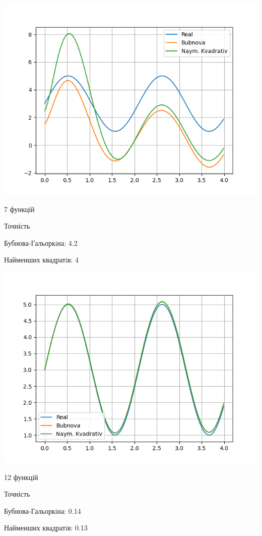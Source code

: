\begin{minipage}{0.5\textwidth}
    \includegraphics[scale=0.5]{7.png}
\end{minipage}%
\begin{minipage}{0.5\textwidth}
7 функцій


Точність


Бубнова-Гальоркiна:  4.2


Найменших квадратiв: 4

\end{minipage}%

\begin{minipage}{0.5\textwidth}
    \includegraphics[scale=0.5]{12.png}
\end{minipage}%
\begin{minipage}{0.5\textwidth}
12 функцій


Точність


Бубнова-Гальоркiна:  0.14


Найменших квадратiв: 0.13

\end{minipage}%


